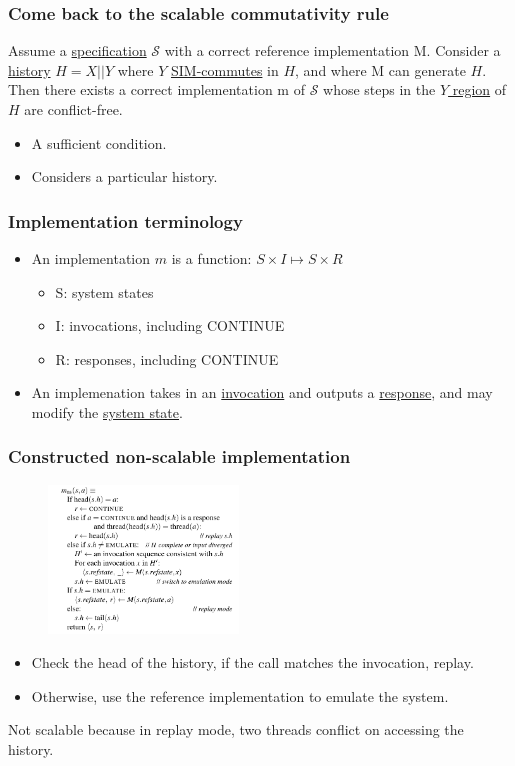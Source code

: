 \documentclass{beamer}
\begin{document}
\begin{frame}
\frametitle{Come back to the scalable commutativity rule}
Assume a \uline{specification} $\mathscr{S}$ with a correct reference 
implementation M. Consider a \uline{history} $H = X || Y$ where $Y$ 
\uline{SIM-commutes} in $H$, 
and where M can generate $H$. Then there exists a correct implementation m of 
$\mathscr{S}$ whose steps in the \uline{$Y$ region} of $H$ are conflict-free.

\begin{itemize}
\item A sufficient condition.
\item Considers a particular history.
\end{itemize}

\end{frame}


\begin{frame}
  \frametitle{Implementation terminology}
  \begin{itemize}
    \item An implementation $m$ is a function: $S \times I \longmapsto S \times R$
      \begin{itemize}
      \item S: system states
      \item I: invocations, including CONTINUE
      \item R: responses, including CONTINUE
      \end{itemize}
    \item An implemenation takes in an \uline{invocation} and outputs a 
      \uline{response}, and may modify the \uline{system state}.
  \end{itemize}
\end{frame}

\begin{frame}
\frametitle{Constructed non-scalable implementation}
\begin{multicols}{2}
\begin{figure}
   \includegraphics[width=0.45\textwidth]{799-s14-docs/nonscalable_imple.png}
 \end{figure}
\columnbreak
\begin{itemize}
\item Check the head of the history, if the call matches the invocation, replay.
\item Otherwise, use the reference implementation to emulate the system.
\end{itemize}
\end{multicols}

Not scalable because in replay mode, two threads conflict on accessing the history.

\end{frame}
\end{document}
